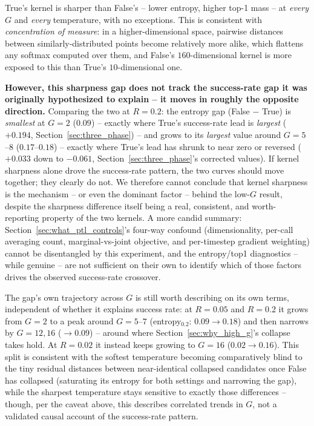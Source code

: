 \documentclass[11pt]{article}
\begin{document}
True's kernel is sharper than False's -- lower entropy, higher top-1 mass
-- at \emph{every} $G$ and \emph{every} temperature, with no exceptions.
This is consistent with \emph{concentration of measure}: in a
higher-dimensional space, pairwise distances between similarly-distributed
points become relatively more alike, which flattens any softmax computed
over them, and False's $160$-dimensional kernel is more exposed to this
than True's $10$-dimensional one.

\textbf{However, this sharpness gap does not track the success-rate gap
it was originally hypothesized to explain -- it moves in roughly the
opposite direction.} Comparing the two at $R=0.2$: the entropy gap
(False $-$ True) is \emph{smallest} at $G=2$ ($0.09$) -- exactly where
True's success-rate lead is \emph{largest} ($+0.194$, Section~\ref{sec:three_phase})
-- and grows to its \emph{largest} value around $G=5$--$8$ ($0.17$--$0.18$)
-- exactly where True's lead has shrunk to near zero or reversed
($+0.033$ down to $-0.061$, Section~\ref{sec:three_phase}'s corrected
values). If kernel sharpness alone drove the
success-rate pattern, the two curves should move together; they clearly
do not. We therefore cannot conclude that kernel sharpness is the
mechanism -- or even the dominant factor -- behind the low-$G$ result,
despite the sharpness difference itself being a real, consistent, and
worth-reporting property of the two kernels. A more candid summary:
Section~\ref{sec:what_ptl_controls}'s four-way confound (dimensionality,
per-call averaging count, marginal-vs-joint objective, and per-timestep
gradient weighting) cannot be disentangled by this experiment, and the
entropy/top1 diagnostics -- while genuine -- are not sufficient on their
own to identify which of those factors drives the observed success-rate
crossover.

The gap's own trajectory across $G$ is still worth describing on its own
terms, independent of whether it explains success rate: at $R=0.05$
and $R=0.2$ it grows from $G=2$ to a peak around $G=5$--$7$
(entropy$_{0.2}$: $0.09\to0.18$) and then narrows by $G=12,16$
($\to0.09$) -- around where Section~\ref{sec:why_high_g}'s collapse takes
hold. At $R=0.02$ it instead keeps growing to $G=16$ ($0.02\to0.16$). This
split is consistent with the softest temperature becoming comparatively
blind to the tiny residual distances between near-identical collapsed
candidates once False has collapsed (saturating its entropy for both
settings and narrowing the gap), while the sharpest temperature stays
sensitive to exactly those differences -- though, per the caveat above,
this describes correlated trends in $G$, not a validated causal account
of the success-rate pattern.
\end{document}
